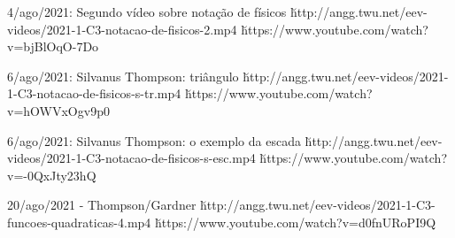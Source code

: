 \documentclass[oneside,12pt]{article}
\begin{document}
{{    \bsk

    4/ago/2021: Segundo vídeo sobre notação de físicos
    \u{http://angg.twu.net/eev-videos/2021-1-C3-notacao-de-fisicos-2.mp4}
    \u{https://www.youtube.com/watch?v=bjBlOqO-7Do}

    \bsk

    6/ago/2021: Silvanus Thompson: triângulo
    \u{http://angg.twu.net/eev-videos/2021-1-C3-notacao-de-fisicos-s-tr.mp4}
    \u{https://www.youtube.com/watch?v=hOWVxOgv9p0}

    \bsk

    6/ago/2021: Silvanus Thompson: o exemplo da escada
    \u{http://angg.twu.net/eev-videos/2021-1-C3-notacao-de-fisicos-s-esc.mp4}
    \u{https://www.youtube.com/watch?v=-0QxJty23hQ}

    \bsk

    20/ago/2021 - Thompson/Gardner
    \u{http://angg.twu.net/eev-videos/2021-1-C3-funcoes-quadraticas-4.mp4}
    \u{https://www.youtube.com/watch?v=d0fnURoPI9Q}



}}










\end{document}
